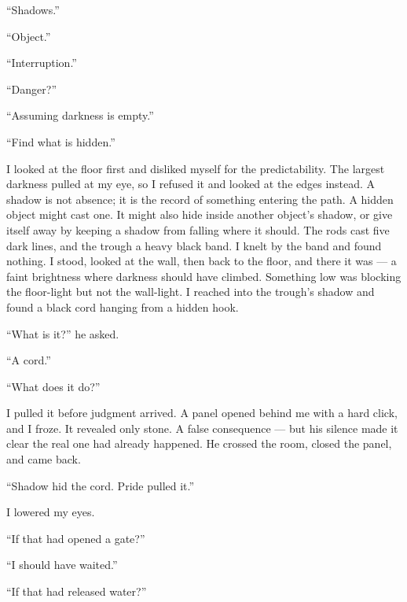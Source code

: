 ``Shadows.''\par

``Object.''\par

``Interruption.''\par

``Danger?''\par

``Assuming darkness is empty.''\par

``Find what is hidden.''\par

I looked at the floor first and disliked myself for the predictability. The largest darkness pulled at my eye, so I refused it and looked at the edges instead. A shadow is not absence; it is the record of something entering the path. A hidden object might cast one. It might also hide inside another object's shadow, or give itself away by keeping a shadow from falling where it should. The rods cast five dark lines, and the trough a heavy black band. I knelt by the band and found nothing. I stood, looked at the wall, then back to the floor, and there it was --- a faint brightness where darkness should have climbed. Something low was blocking the floor-light but not the wall-light. I reached into the trough's shadow and found a black cord hanging from a hidden hook.\par

``What is it?'' he asked.\par

``A cord.''\par

``What does it do?''\par

I pulled it before judgment arrived. A panel opened behind me with a hard click, and I froze. It revealed only stone. A false consequence --- but his silence made it clear the real one had already happened. He crossed the room, closed the panel, and came back.\par

``Shadow hid the cord. Pride pulled it.''\par

I lowered my eyes.\par

``If that had opened a gate?''\par

``I should have waited.''\par

``If that had released water?''\par

